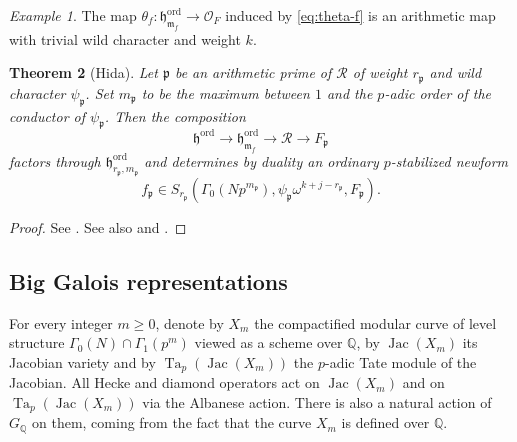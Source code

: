 \documentclass[12pt,reqno]{amsart}
\newtheorem{theorem}{Theorem}[section]
\theoremstyle{definition}
\theoremstyle{remark}
\newtheorem{example}[theorem]{Example}
\newcommand{\numberset}{\mathbb}
\newcommand{\Q}{\numberset{Q}}
\newcommand{\OF}{\mathcal{O}_F}
\DeclareMathOperator{\Jac}{Jac}
\DeclareMathOperator{\Ta}{Ta}
\DeclareMathOperator{\ord}{ord}
\newcommand{\m}{\mathfrak{m}}
\newcommand{\p}{\mathfrak{p}}
\newcommand{\h}{\mathfrak{h}}
\begin{document}
    \begin{example}
        The map $\theta_f\colon \h_{\m_f}^{\ord}\to\OF$ induced by \eqref{eq:theta-f} is an arithmetic map with trivial wild character and weight $k$.
    \end{example}

    \begin{theorem}[Hida]\label{thm:main-thm-Hida-families}
       Let $\p$ be an arithmetic prime of $\mathcal{R}$ of weight $r_\p$ and wild character $\psi_\p$. Set $m_\p$ to be the maximum between $1$ and the $p$-adic order of the conductor of $\psi_\p$. Then the composition
        \begin{equation*}
            \h^{\ord}\longrightarrow\h_{\m_f}^{\ord}\longrightarrow\mathcal{R}\longrightarrow F_\p
        \end{equation*}
        factors through $\h_{r_\p,m_\p}^{\ord}$ and determines by duality an ordinary $p$-stabilized newform
        \begin{equation*}
            f_\p\in S_{r_\p}(\Gamma_0(Np^{m_\p}),\psi_\p\omega^{k+j-r_\p},F_\p).
        \end{equation*}
    \end{theorem}
    \begin{proof}
        See \cite[p.300]{Longo-Vigni11:quaternion-algebras-Hida-families}. See also \cite[p.97]{Howard07:variation-of-Heegner-points-in-Hida-families} and \cite[§12.7.4 and §12.7.5]{Nekovar06:selmer-complexes}.
    \end{proof}

\subsection{Big Galois representations}
   
 For every integer $m\ge 0$, denote by $X_m$ the compactified modular curve of level structure $\Gamma_0(N)\cap\Gamma_1(p^m)$ viewed as a scheme over $\Q$, by $\Jac(X_m)$ its Jacobian variety and by $\Ta_p(\Jac(X_m))$ the $p$-adic Tate module of the Jacobian. All Hecke and diamond operators act on $\Jac(X_m)$ and on $\Ta_p(\Jac(X_m))$ via the Albanese action. There is also a natural action of $G_\Q$ on them, coming from the fact that the curve $X_m$ is defined over $\Q$.
    
\end{document}
